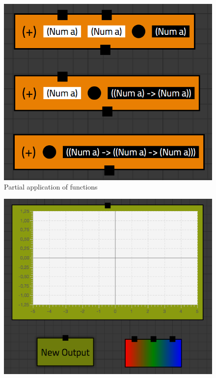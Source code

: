 \begin{figure}[p]
	\centering
	\includegraphics[scale=0.5]{Images/blocks-bowties}
	\caption{Partial application of functions}
	\label{fig:blocks-bowties}
\end{figure}

\begin{figure}[p]
	\centering
	\includegraphics[scale=0.5]{Images/blocks-outputs}
	\label{fig:blocks-outputs}
\end{figure}


